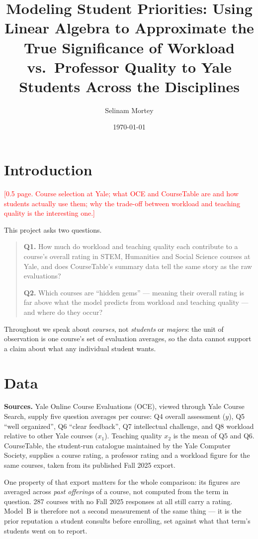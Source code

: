 \documentclass[11pt]{article}
\title{Modeling Student Priorities: Using Linear Algebra to Approximate the
True Significance of Workload vs.\ Professor Quality to Yale Students Across
the Disciplines}
\author{\tbd{Member A} \and \tbd{Member B} \and Selinam Mortey}
\date{\today}
\newcommand{\tbd}[1]{\textcolor{red}{[#1]}}
\begin{document}
\maketitle

\section{Introduction}

\tbd{0.5 page. Course selection at Yale; what OCE and CourseTable are and how
students actually use them; why the trade-off between workload and teaching
quality is the interesting one.}

This project asks two questions.

\begin{quote}
\textbf{Q1.} How much do workload and teaching quality each contribute to a
course's overall rating in STEM, Humanities and Social Science courses at Yale,
and does CourseTable's summary data tell the same story as the raw evaluations?

\textbf{Q2.} Which courses are ``hidden gems'' --- meaning their overall rating
is far above what the model predicts from workload and teaching quality --- and
where do they occur?
\end{quote}

Throughout we speak about \emph{courses}, not \emph{students} or \emph{majors}:
the unit of observation is one course's set of evaluation averages, so the data
cannot support a claim about what any individual student wants.

\section{Data}

\textbf{Sources.} Yale Online Course Evaluations (OCE), viewed through Yale
Course Search, supply five question averages per course: Q4 overall assessment
($y$), Q5 ``well organized'', Q6 ``clear feedback'', Q7 intellectual challenge,
and Q8 workload relative to other Yale courses ($x_1$). Teaching quality $x_2$
is the mean of Q5 and Q6. CourseTable, the student-run catalogue maintained by
the Yale Computer Society, supplies a course rating, a professor rating and a
workload figure for the same courses, taken from its published Fall 2025 export.

One property of that export matters for the whole comparison: its figures are
averaged across \emph{past offerings} of a course, not computed from the term in
question. 287 courses with no Fall 2025 responses at all still carry a rating.
Model~B is therefore not a second measurement of the same thing --- it is the
prior reputation a student consults before enrolling, set against what that
term's students went on to report.
\end{document}
